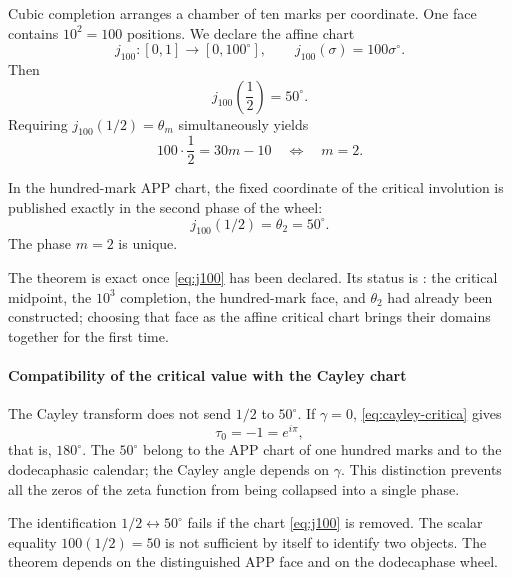 Cubic completion arranges a chamber of ten marks per coordinate. One
face contains \(10^2=100\) positions. We declare the affine chart
\begin{equation}
j_{100}:[0,1]\longrightarrow[0,100^\circ],
\qquad j_{100}(\sigma)=100\sigma^\circ.
\label{eq:j100}
\end{equation}
Then
\[
j_{100}\left(\frac12\right)=50^\circ.
\]
Requiring \(j_{100}(1/2)=\theta_m\) simultaneously yields
\[
100\cdot\frac12=30m-10
\quad\Longleftrightarrow\quad m=2.
\]

\begin{theorem}
In the hundred-mark APP chart, the fixed coordinate of the critical involution
is published exactly in the second phase of the wheel:
\begin{equation}
\boxed{j_{100}(1/2)=\theta_2=50^\circ.}
\label{eq:igualador-50}
\end{equation}
The phase \(m=2\) is unique.
\end{theorem}

The theorem is exact once \eqref{eq:j100} has been declared. Its status is
: the critical midpoint, the \(10^3\) completion, the hundred-mark face, and \(\theta_2\) had already been constructed; choosing that face as the affine critical chart brings their domains together for the first time.

\paragraph{Compatibility of the critical value with the Cayley chart}

The Cayley transform does not send \(1/2\) to \(50^\circ\). If
\(\gamma=0\), \eqref{eq:cayley-critica} gives
\[
\tau_0=-1=e^{i\pi},
\]
that is, \(180^\circ\). The \(50^\circ\) belong to the APP chart of one hundred
marks and to the dodecaphasic calendar; the Cayley angle depends on \(\gamma\).
This distinction prevents all the zeros of the zeta function from being collapsed into a single
phase.

\begin{falsifier}
The identification \(1/2\leftrightarrow50^\circ\) fails if the
chart \eqref{eq:j100} is removed. The scalar equality \(100(1/2)=50\) is not sufficient
by itself to identify two objects. The theorem depends on the distinguished
APP face and on the dodecaphase wheel.
\end{falsifier}

